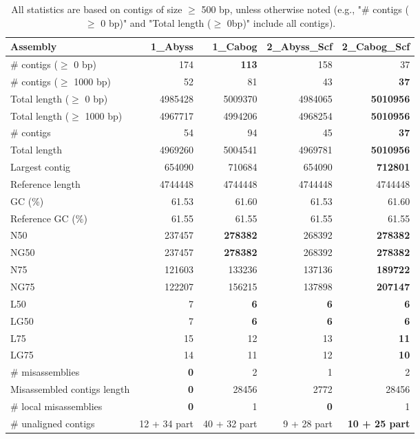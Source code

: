 \documentclass[12pt,a4paper]{article}
\begin{document}
\begin{table}[ht]
\begin{center}
\caption{All statistics are based on contigs of size $\geq$ 500 bp, unless otherwise noted (e.g., "\# contigs ($\geq$ 0 bp)" and "Total length ($\geq$ 0bp)" include all contigs).}
\begin{tabular}{|l*{4}{|r}|}
\hline
Assembly & 1\_Abyss & 1\_Cabog & 2\_Abyss\_Scf & 2\_Cabog\_Scf \\ \hline
\# contigs ($\geq$ 0 bp) & 174 & {\bf 113} & 158 & 37 \\ \hline
\# contigs ($\geq$ 1000 bp) & 52 & 81 & 43 & {\bf 37} \\ \hline
Total length ($\geq$ 0 bp) & 4985428 & 5009370 & 4984065 & {\bf 5010956} \\ \hline
Total length ($\geq$ 1000 bp) & 4967717 & 4994206 & 4968254 & {\bf 5010956} \\ \hline
\# contigs & 54 & 94 & 45 & {\bf 37} \\ \hline
Total length & 4969260 & 5004541 & 4969781 & {\bf 5010956} \\ \hline
Largest contig & 654090 & 710684 & 654090 & {\bf 712801} \\ \hline
Reference length & 4744448 & 4744448 & 4744448 & 4744448 \\ \hline
GC (\%) & 61.53 & 61.60 & 61.53 & 61.60 \\ \hline
Reference GC (\%) & 61.55 & 61.55 & 61.55 & 61.55 \\ \hline
N50 & 237457 & {\bf 278382} & 268392 & {\bf 278382} \\ \hline
NG50 & 237457 & {\bf 278382} & 268392 & {\bf 278382} \\ \hline
N75 & 121603 & 133236 & 137136 & {\bf 189722} \\ \hline
NG75 & 122207 & 156215 & 137898 & {\bf 207147} \\ \hline
L50 & 7 & {\bf 6} & {\bf 6} & {\bf 6} \\ \hline
LG50 & 7 & {\bf 6} & {\bf 6} & {\bf 6} \\ \hline
L75 & 15 & 12 & 13 & {\bf 11} \\ \hline
LG75 & 14 & 11 & 12 & {\bf 10} \\ \hline
\# misassemblies & {\bf 0} & 2 & 1 & 2 \\ \hline
Misassembled contigs length & {\bf 0} & 28456 & 2772 & 28456 \\ \hline
\# local misassemblies & {\bf 0} & 1 & {\bf 0} & 1 \\ \hline
\# unaligned contigs & 12 + 34 part & 40 + 32 part & 9 + 28 part & {\bf 10 + 25 part} \\ \hline

\end{tabular}
\end{center}
\end{table}
\end{document}
